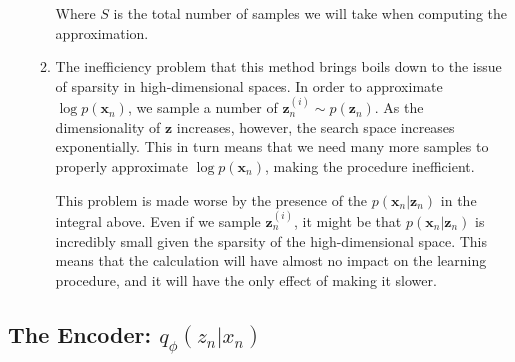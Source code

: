 \documentclass{article}
\begin{document}
\begin{enumerate}[label=\textbf{1.\arabic*}]
\begin{enumerate}[label=(\alph*)]
    Where $S$ is the total number of samples we will take when computing the approximation.

    \item
    The inefficiency problem that this method brings boils down to the issue of sparsity in high-dimensional spaces. In order to approximate $\log p(\bm{x}_n)$, we sample a number of $\bm{z}_n^{(i)} \sim p(\bm{z}_n)$. As the dimensionality of $\bm{z}$ increases, however, the search space increases exponentially. This in turn means that we need many more samples to properly approximate $\log p(\bm{x}_n)$, making the procedure inefficient.

    This problem is made worse by the presence of the $p(\bm{x}_n | \bm{z}_n)$ in the integral above. Even if we sample $\bm{z}_n^{(i)}$, it might be that $p(\bm{x}_n | \bm{z}_n)$ is incredibly small given the sparsity of the high-dimensional space. This means that the calculation will have almost no impact on the learning procedure, and it will have the only effect of making it slower.

  \end{enumerate}
\end{enumerate}

\subsection{The Encoder: $q_{\phi}(z_n | x_n)$}
\end{document}
